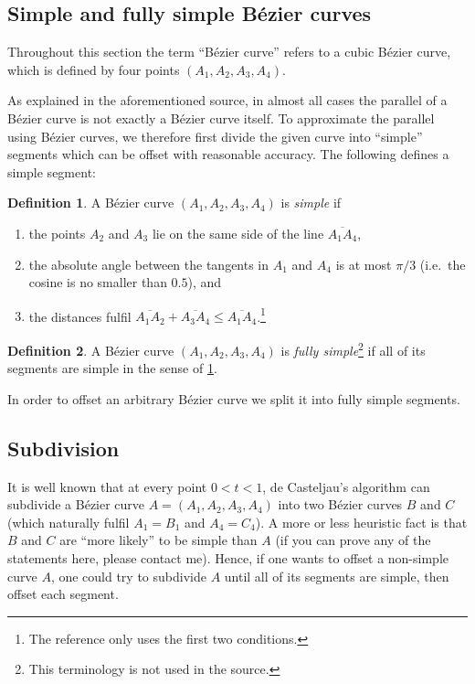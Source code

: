 \documentclass[12pt,a4paper]{article}
\theoremstyle{definition}
\newtheorem{definition}{Definition}[section]
\begin{document}
\subsection{Simple and fully simple Bézier curves}

Throughout this section the term ``Bézier curve'' refers to a cubic Bézier curve, which is defined by four points $(A_1, A_2, A_3, A_4)$.

As explained in the aforementioned source, in almost all cases the parallel of a Bézier curve is not exactly a Bézier curve itself. To approximate the parallel using Bézier curves, we therefore first divide the given curve into ``simple'' segments which can be offset with reasonable accuracy. The following defines a simple segment:
\begin{definition}
  \label{def:simpleCurve}
  A Bézier curve $(A_1, A_2, A_3, A_4)$ is \emph{simple} if
  \begin{enumerate}
    \item the points $A_2$ and $A_3$ lie on the same side of the line $\overline{A_1A_4}$,
    \item the absolute angle between the tangents in $A_1$ and $A_4$ is at most $\pi/3$ (i.e.\ the cosine is no smaller than $0.5$), and
    \item the distances fulfil $\overline{A_1A_2} + \overline{A_3A_4} \leq \overline{A_1A_4}$.\footnote{The reference only uses the first two conditions.}
  \end{enumerate}
\end{definition}
\begin{definition}
  \label{def:fullySimpleCurve}
  A Bézier curve $(A_1, A_2, A_3, A_4)$ is \emph{fully simple}\footnote{This terminology is not used in the source.} if all of its segments are simple in the sense of \cref{def:simpleCurve}.
\end{definition}
In order to offset an arbitrary Bézier curve we split it into fully simple segments.

\subsection{Subdivision}

It is well known that at every point $0 < t < 1$, de Casteljau's algorithm can subdivide a Bézier curve $A = (A_1, A_2, A_3, A_4)$ into two Bézier curves $B$ and $C$ (which naturally fulfil $A_1 = B_1$ and $A_4 = C_4$). A more or less heuristic fact is that $B$ and $C$ are ``more likely'' to be simple than $A$ (if you can prove any of the statements here, please contact me). Hence, if one wants to offset a non-simple curve $A$, one could try to subdivide $A$ until all of its segments are simple, then offset each segment.
\end{document}
